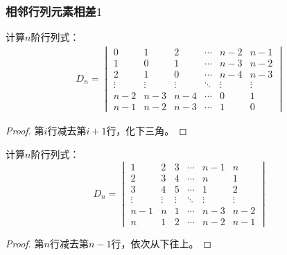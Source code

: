 \subsubsection{相邻行列元素相差$1$}
\begin{theorem}
	计算$n$阶行列式：
	\begin{align*}
		D_n=
		\begin{vmatrix}
			0 & 1 & 2 & \cdots & n-2 & n-1 \\
			1 & 0 & 1 & \cdots & n-3 & n-2 \\
			2 & 1 & 0 & \cdots & n-4 & n-3 \\
			\vdots & \vdots & \vdots & \ddots & \vdots & \vdots \\
			n-2 & n-3 & n-4 & \cdots & 0 & 1 \\
			n-1 & n-2 & n-3 & \cdots & 1 & 0
		\end{vmatrix}
	\end{align*}
\end{theorem}
\begin{proof}
	第$i$行减去第$i+1$行，化下三角。
\end{proof}
\begin{theorem}
	计算$n$阶行列式：
	\begin{equation*}
		D_n
		=
		\begin{vmatrix}
			1 & 2 & 3 & \cdots & n-1 & n \\
			2 & 3 & 4 & \cdots & n & 1 \\
			3 & 4 & 5 & \cdots & 1 & 2 \\
			\vdots & \vdots & \vdots & \ddots & \vdots & \vdots \\
			n-1 & n & 1 & \cdots & n-3 & n-2 \\
			n & 1 & 2 & \cdots & n-2 & n-1
		\end{vmatrix}
	\end{equation*}
\end{theorem}
\begin{proof}
	第$n$行减去第$n-1$行，依次从下往上。
\end{proof}

